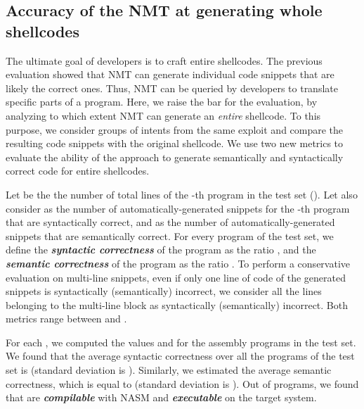 \subsection{Accuracy of the NMT at generating whole shellcodes}
\label{subsec:RQ3}
The ultimate goal of developers is to craft entire shellcodes. The previous evaluation showed that NMT can generate individual code snippets that are likely the correct ones. Thus, NMT can be queried by developers to translate specific parts of a program. Here, we raise the bar for the evaluation, by analyzing to which extent NMT can generate an \emph{entire} shellcode. To this purpose, we consider groups of intents from the same exploit and compare the resulting code snippets with the original shellcode. We use two new metrics to evaluate the ability of the approach to generate semantically and syntactically correct code for entire shellcodes.

Let  be the the number of total lines of the -th program in the test set (). Let also consider  as the number of automatically-generated snippets for the -th program that are syntactically correct, and  as the number of automatically-generated snippets that are semantically correct. For every program of the test set, we define the \textit{\textbf{syntactic correctness}} of the program  as the ratio , and the \textit{\textbf{semantic correctness}} of the program as the ratio . 
To perform a conservative evaluation on multi-line snippets, even if only one line of code of the generated snippets is syntactically (semantically) incorrect, we consider all the lines belonging to the multi-line block as syntactically (semantically) incorrect. 
Both metrics range between  and .


For each , we computed the values  and  for the assembly programs in the test set. 
We found that the average syntactic correctness over all the programs of the test set is  (standard deviation is ). Similarly, we estimated the average semantic correctness, which is equal to  (standard deviation is ). Out of  programs, we found that  are \textbf{\textit{compilable}} with NASM and \textbf{\textit{executable}} on the target system.









